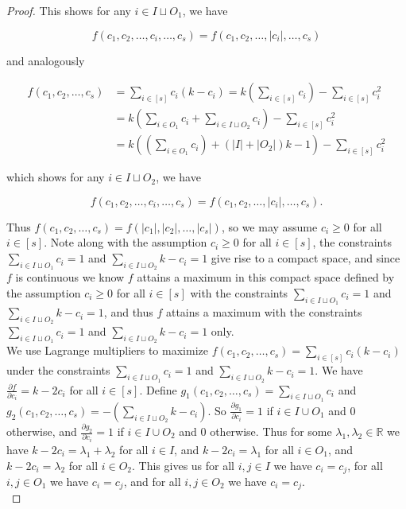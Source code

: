\documentclass[10pt,a4paper]{amsart}
\begin{document}
\begin{proof}
\noindent
This shows for any $i \in I \sqcup O_1$, we have 

$$f(c_1,c_2, \ldots, c_i, \ldots, c_s) = f(c_1,c_2, \ldots, |c_i|, \ldots, c_s)$$

\noindent
and analogously 

\begin{align*}
f(c_1,c_2,\ldots,c_{s}) &= \sum_{i \in [s]} c_i(k-c_i) = k \left( \sum_{i \in [s]} c_i \right) - \sum_{i \in [s]} c_i^2 \\
&= k \left( \sum_{i \in O_1} c_i + \sum_{i \in I \sqcup O_2} c_i \right) - \sum_{i \in [s]} c_i^2 \\
&= k \left( \left( \sum_{i \in O_1} c_i \right) +  (|I| + |O_2|)k-1  \right) - \sum_{i \in [s]} c_i^2
\end{align*}

\noindent 
which shows for any $i \in I \sqcup O_2$, we have 

$$f(c_1,c_2, \ldots, c_i, \ldots, c_s) = f(c_1,c_2, \ldots, |c_i|, \ldots, c_s).$$ 

\noindent
Thus $f(c_1,c_2,\ldots,c_s) = f(|c_1|,|c_2|,\ldots,|c_s|)$, so we may assume $c_i \geq 0$ for all $i \in [s]$. Note along with the assumption $c_i \geq 0$ for all $i \in [s]$, the constraints $\sum_{i \in I \sqcup O_1} c_i = 1$ and $\sum_{i \in I \sqcup O_2 } k-c_i = 1$ give rise to a compact space, and since $f$ is continuous we know $f$ attains a maximum in this compact space defined by the assumption $c_i \geq 0$ for all $i \in [s]$ with the constraints $\sum_{i \in I \sqcup O_1} c_i = 1$ and $\sum_{i \in I \sqcup O_2 } k-c_i = 1$, and thus $f$ attains a maximum with the constraints $\sum_{i \in I \sqcup O_1} c_i = 1$ and $\sum_{i \in I \sqcup O_2 } k-c_i = 1$ only. \\

We use Lagrange multipliers to maximize $f(c_1,c_2,\ldots,c_{s}) = \sum_{i \in [s]} c_i(k-c_i)$ under the constraints $\sum_{i \in I \sqcup O_1} c_i = 1$ and $\sum_{i \in I \sqcup O_2 } k-c_i = 1$. We have $\frac{\partial f}{\partial c_i} = k - 2c_i$ for all $i \in [s]$. Define $g_1(c_1,c_2,\ldots,c_s) = \sum_{i \in I \sqcup O_1} c_i$ and $g_2(c_1,c_2,\ldots,c_s) = -(\sum_{i \in I \sqcup O_2 } k-c_i)$. So $\frac{\partial g_1}{\partial c_i} = 1$ if $i \in I \cup O_1$ and $0$ otherwise, and $\frac{\partial g_2}{\partial c_i} = 1$ if $i \in I \cup O_2$ and $0$ otherwise. Thus for some $\lambda_1,\lambda_2 \in \mathbb{R}$ we have 
$k-2c_i = \lambda_1+\lambda_2$ for all $i \in I$, and $k-2c_i = \lambda_1$ for all $i \in O_1$, and $k-2c_i = \lambda_2$ for all $i \in O_2$. This gives us for all $i,j \in I$ we have $c_i = c_j$, for all $i,j \in O_1$ we have $c_i = c_j$, and for all $i,j \in O_2$ we have $c_i = c_j$. \\


\end{proof}
\end{document}
